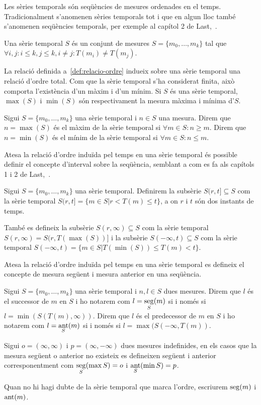 Les sèries temporals són seqüències de mesures ordenades en el temps. 
Tradicionalment s'anomenen sèries temporals tot i que en algun lloc també s'anomenen seqüències temporals, per exemple al capítol 2 de Last,~\cite{last}.


\begin{definition}
  Una sèrie temporal $S$ és un conjunt de mesures
  $S=\{m_0,\ldots,m_k\}$ tal que 
  $\forall i,j: i\leq k, j\leq k, i\neq j : T(m_i)\neq T(m_j)$.
\end{definition}

La relació definida a~\ref{def:relacio-ordre} indueix sobre una sèrie
temporal una relació d'ordre total. Com que la sèrie temporal s'ha
considerat finita, això comporta l'existència d'un màxim i d'un mínim.
Si $S$ és una sèrie temporal, $\max(S)$ i $\min(S)$ són respectivament
la mesura màxima i mínima d'$S$. 

\begin{definition}
  Sigui $S=\{m_0,\ldots,m_k\}$ una sèrie temporal i $n\in S$ una
  mesura.  Direm que $n=\max(S)$ és el màxim de la sèrie temporal si
  $\forall m \in S: n \geq m $.  Direm que $n=\min(S)$ és el mínim de
  la sèrie temporal si $\forall m \in S: n \leq m$.
\end{definition}

Atesa la relació d'ordre induïda pel temps en una sèrie temporal és
possible definir el concepte d'interval sobre la seqüència, semblant a
com es fa als capítols 1 i 2 de Last,~\cite{last}.

\begin{definition}
  Sigui $S=\{m_0, \ldots, m_k\}$ una sèrie temporal. Definirem la
  subsèrie $S(r,t] \subseteq S$ com la sèrie temporal $S(r,t]=\{m\in S
  | r<T(m)\leq t\}$, a on $r$ i $t$ són dos instants de temps.

  També es defineix la subsèrie $S(r,\infty)\subseteq S$ com la sèrie
  temporal $S(r,\infty) = S(r,T(\max(S))]$ i la subsèrie
  $S(-\infty,t)\subseteq S$ com la sèrie temporal $S(-\infty,t) =
  \{m\in S | T(\min(S))\leq T(m) < t\}$.
\end{definition}

Atesa la relació d'ordre induïda pel temps en una sèrie temporal es defineix el concepte de mesura següent i mesura anterior en una seqüència.

\begin{definition}
  Sigui $S=\{m_0, \ldots, m_k\}$ una sèrie temporal i $n,l\in S$ dues
  mesures. Direm que $l$ és el successor de $m$ en $S$ i ho notarem
  com $l=\operatorname*{seg}\limits_S(m)$ si i només si $l=\min(S(T(m),\infty))$.
  Direm que $l$ és el predecessor de $m$ en $S$ i ho notarem com
  $l=\operatorname*{ant}\limits_S(m)$ si i només si $l=\max(S(-\infty,T(m))$.

  Sigui $o=(\infty,\infty)$ i $p=(\infty,-\infty)$ dues mesures
  indefinides, en els casos que la mesura següent o anterior no
  existeix es defineixen següent i anterior corresponentment com
  $\operatorname*{seg}\limits_S(\max S)=o$ i $\operatorname*{ant}\limits_S(\min S)=p$.
\end{definition}
Quan no hi hagi dubte de la sèrie temporal que marca l'ordre, escriurem $\operatorname*{seg}(m)$ i $\operatorname*{ant}(m)$.



